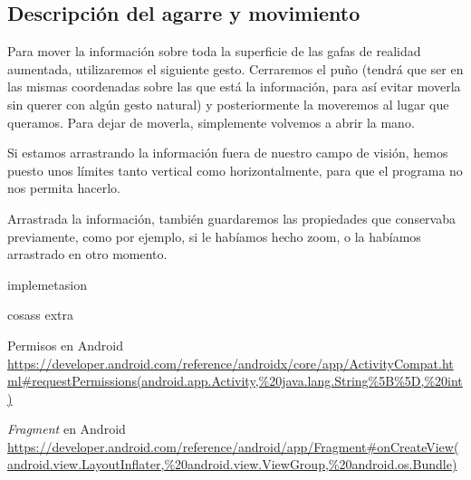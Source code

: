 \documentclass[11pt,a4paper]{article}
\begin{document}
\subsection{Descripción del agarre y movimiento}
Para mover la información sobre toda la superficie de las gafas de realidad aumentada, utilizaremos el siguiente gesto. Cerraremos el puño
(tendrá que ser en las mismas coordenadas sobre las que está la información, para así evitar moverla sin querer con algún gesto natural) y
posteriormente la moveremos al lugar que queramos. Para dejar de moverla, simplemente volvemos a abrir la mano.

Si estamos arrastrando la información fuera de nuestro campo de visión, hemos puesto unos límites tanto vertical como horizontalmente, para que
el programa no nos permita hacerlo.

Arrastrada la información, también guardaremos las propiedades que conservaba previamente, como por ejemplo, si le habíamos hecho zoom, o la
habíamos arrastrado en otro momento.

implemetasion

cosass extra

\newpage

\begin{thebibliography}{5}

Permisos en Android
\\\url{https://developer.android.com/reference/androidx/core/app/ActivityCompat.html#requestPermissions(android.app.Activity,%20java.lang.String%5B%5D,%20int)}

\textit{Fragment} en Android
\\\url{https://developer.android.com/reference/android/app/Fragment#onCreateView(android.view.LayoutInflater,%20android.view.ViewGroup,%20android.os.Bundle)}

\end{thebibliography}
\end{document}

